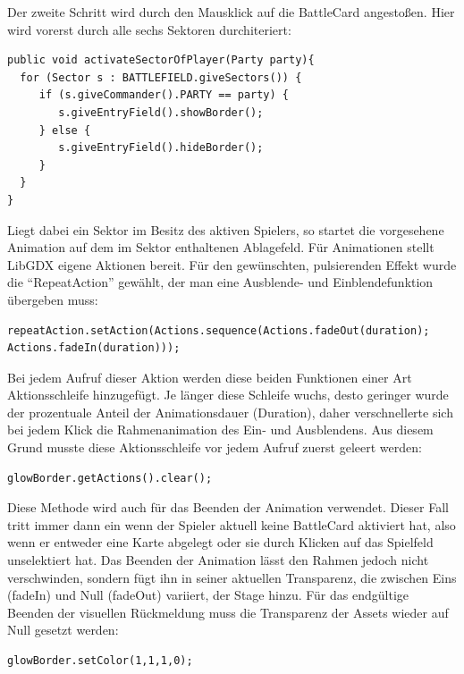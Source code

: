 Der zweite Schritt wird durch den Mausklick auf die BattleCard angestoßen. Hier wird vorerst durch alle sechs Sektoren durchiteriert:

\begin{lstlisting}
public void activateSectorOfPlayer(Party party){
  for (Sector s : BATTLEFIELD.giveSectors()) {
     if (s.giveCommander().PARTY == party) {
        s.giveEntryField().showBorder();
     } else {
        s.giveEntryField().hideBorder();
     }
  }
}
\end{lstlisting}

Liegt dabei ein Sektor im Besitz des aktiven Spielers, so startet die vorgesehene Animation auf dem im Sektor enthaltenen Ablagefeld.
Für Animationen stellt LibGDX eigene Aktionen bereit. Für den gewünschten, pulsierenden Effekt wurde die “RepeatAction” gewählt, der man eine Ausblende- und Einblendefunktion übergeben muss:

\begin{lstlisting}
repeatAction.setAction(Actions.sequence(Actions.fadeOut(duration);
Actions.fadeIn(duration)));
\end{lstlisting}

Bei jedem Aufruf dieser Aktion werden diese beiden Funktionen einer Art Aktionsschleife hinzugefügt. Je länger diese Schleife wuchs, desto geringer wurde der prozentuale Anteil der Animationsdauer (Duration), daher verschnellerte sich bei jedem Klick die Rahmenanimation des Ein- und Ausblendens. Aus diesem Grund musste diese Aktionsschleife vor jedem Aufruf zuerst geleert werden:

\begin{lstlisting}
glowBorder.getActions().clear();
\end{lstlisting}

Diese Methode wird auch für das Beenden der Animation verwendet. Dieser Fall tritt immer dann ein wenn der Spieler aktuell keine BattleCard aktiviert hat, also wenn er entweder eine Karte abgelegt oder sie durch Klicken auf das Spielfeld unselektiert hat.
Das Beenden der Animation lässt den Rahmen jedoch nicht verschwinden, sondern fügt ihn in seiner aktuellen Transparenz, die zwischen Eins (fadeIn) und Null (fadeOut) variiert, der Stage hinzu. Für das endgültige Beenden der visuellen Rückmeldung muss die Transparenz der Assets wieder auf Null gesetzt werden:

\begin{lstlisting}
glowBorder.setColor(1,1,1,0);
\end{lstlisting}

